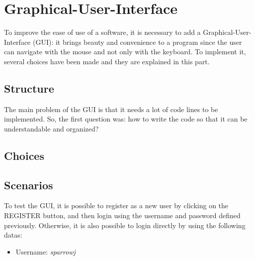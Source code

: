 \section{Graphical-User-Interface}
To improve the ease of use of a software, it is necessary to add a Graphical-User-Interface (GUI): it brings beauty and convenience to a program since the user can navigate with the mouse and not only with the keyboard. To implement it, several choices have been made and they are explained in this part.
\subsection{Structure}
\label{sub:structure}
The main problem of the GUI is that it needs a lot of code lines to be implemented. So, the first question was: how to write the code so that it can be understandable and organized?
\begin{comment}
each panel in a single class
separation creation of panels (and add actionlisteners) and definition of listeners
panelCreator - frame + each panel/menuBar in attributes
launch - definition of listeners
use of menuBar
\end{comment}


\subsection{Choices}
\label{sub:choices}

\begin{comment}
same design for each user panel, why ?
use of menu bars, why ?
use of inner classes and not "if blocks", why ?
use of stack for back button
position/size buttons: use of pixels -> Pb computers
\end{comment}
\subsection{Scenarios}
To test the GUI, it is possible to register as a new user by clicking on the REGISTER button, and then login using the username and password defined previously. Otherwise, it is also possible to login directly by using the following datas:
\begin{itemize}
	\item{}Username: \textit{sparrowj}
\end{itemize}
\label{sub:scenarios}
